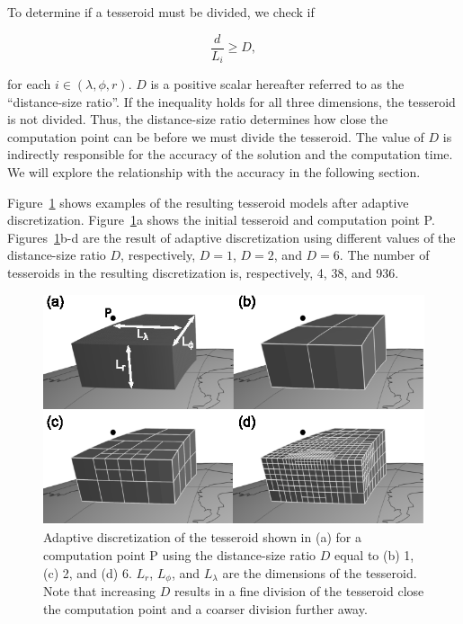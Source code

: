 To determine if a tesseroid must be divided,
we check if

\begin{equation}
    \frac{d}{L_i} \geq D,
    \label{eq:p2-condition}
\end{equation}

\noindent
for each $i \in (\lambda, \phi, r)$.
$D$ is a positive scalar
hereafter referred to as the ``distance-size ratio''.
If the inequality holds for all three dimensions,
the tesseroid is not divided.
Thus, the distance-size ratio determines
how close the computation point can be
before we must divide the tesseroid.
The value of $D$ is indirectly responsible for
the accuracy of the solution and the computation time.
We will explore the relationship with the accuracy in the following section.

Figure~\ref{fig:p2-division} shows examples of
the resulting tesseroid models after adaptive discretization.
Figure~\ref{fig:p2-division}a shows
the initial tesseroid and computation point P.
Figures~\ref{fig:p2-division}b-d are
the result of adaptive discretization using
different values of the distance-size ratio $D$,
respectively,
$D=1$, $D=2$, and $D=6$.
The number of tesseroids in the resulting discretization is, respectively,
4, 38, and 936.

\begin{figure}
    \centering
    \includegraphics[width=\textwidth]{figures/paper-tesseroids/tesseroid-split}
    \caption{
        Adaptive discretization
        of the tesseroid shown in (a)
        for a computation point P
        using the distance-size ratio $D$ equal to
        (b) 1, (c) 2, and (d) 6.
        $L_r$, $L_\phi$, and $L_\lambda$ are the dimensions of the tesseroid.
        Note that increasing $D$
        results in a fine division of the tesseroid
        close the computation point
        and a coarser division further away.
    }
    \label{fig:p2-division}
\end{figure}

